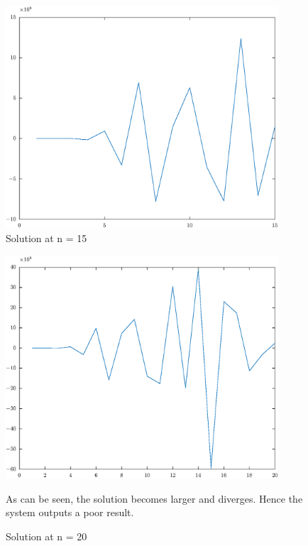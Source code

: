 \documentclass[11pt]{article}
\begin{document}
\begin{figure}[!hbt]
\begin{center}
	\includegraphics[width=4in]{math609_pa1_comp_example_3_n_15_.eps}
	\caption{Solution  at n = 15}
\end{center}
\end{figure}

\begin{figure}[!hbt]
\begin{center}
	\includegraphics[width=4in]{math609_pa1_comp_example_3_n_20_.eps}
	\caption{Solution  at n = 20}

As can be seen, the solution becomes larger and diverges. Hence the system outputs a poor result.
\end{center}
\end{figure}
\end{document}
